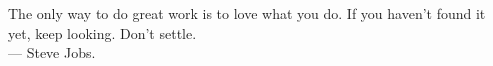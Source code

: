 
\cleardoublepage
{}
\thispagestyle{empty}

\vspace*{3cm}

\begin{center}
The only way to do great work is to love what you do. If you haven't found it yet, keep looking. Don't settle. \\ \medskip
--- Steve Jobs.   
\end{center}

\medskip

